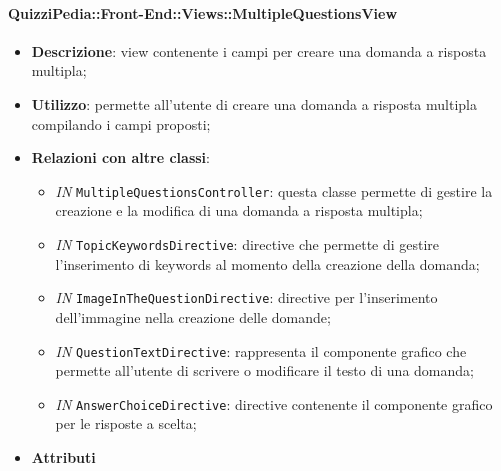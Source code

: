 \paragraph{QuizziPedia::Front-End::Views::MultipleQuestionsView}
\begin{itemize}
	\item \textbf{Descrizione}: view contenente i campi per creare una domanda a risposta multipla;
	\item \textbf{Utilizzo}: permette all'utente di creare una domanda a risposta multipla compilando i campi proposti;
	\item \textbf{Relazioni con altre classi}:
		\begin{itemize}
			\item \textit{IN} \texttt{MultipleQuestionsController}: questa classe permette di gestire la creazione e la modifica di una domanda
			a risposta multipla;
			\item \textit{IN} \texttt{TopicKeywordsDirective}: directive che permette di gestire l'inserimento di keywords al momento della creazione della domanda;
			\item \textit{IN} \texttt{ImageInTheQuestionDirective}: directive per l'inserimento dell'immagine nella creazione delle domande;
			\item \textit{IN} \texttt{QuestionTextDirective}: rappresenta il componente grafico che permette all'utente di scrivere o modificare il testo di una domanda;
			\item \textit{IN} \texttt{AnswerChoiceDirective}: directive contenente il componente grafico per le risposte a scelta;
		\end{itemize}
	\item \textbf{Attributi}
\end{itemize}

